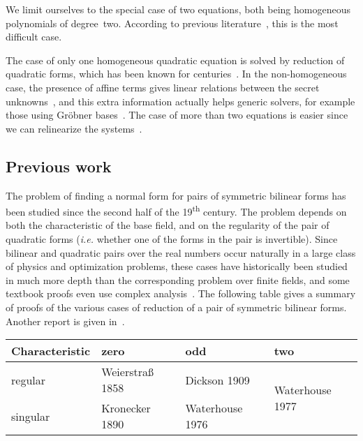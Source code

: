 \documentclass{lms}
\begin{document}
We limit ourselves to the special case of two equations, both
being homogeneous polynomials of degree~two. According to previous
literature~\cite{DBLP:conf/eurocrypt/Perret05,DBLP:conf/eurocrypt/FaugereP06,DBLP:conf/pkc/BouillaguetFFP11,DBLP:conf/eurocrypt/BouillaguetFV13},
this is the most difficult case.

The case of only one homogeneous quadratic equation
is solved by reduction of quadratic forms,
which has been known for centuries~\cite{gauss,lidl1997finite}.
In the non-homogeneous case, the presence of affine terms
gives linear relations between
the secret unknowns~\cite{DBLP:conf/eurocrypt/PatarinGC98},
and this extra information actually helps generic solvers,
for example those using Gröbner bases~\cite{DBLP:conf/eurocrypt/FaugereP06}.
The case of more than two equations is easier since we can relinearize
the systems~\cite{DBLP:conf/pkc/BouillaguetFFP11}.

\subsection*{Previous work}

The problem of finding a normal form for pairs of symmetric bilinear forms
has been studied since the second half of the 19\textsuperscript{th} century.
The problem depends on both the characteristic of the base field,
and on the regularity of the pair of quadratic forms
(\emph{i.e.} whether one of the forms in the pair is invertible).
Since bilinear and quadratic pairs over the real numbers occur naturally
in a large class of physics and optimization problems,
these cases have historically been studied in much more depth
than the corresponding problem over finite fields,
and some textbook proofs even use complex analysis~\cite[XII(56)]{Gantmacher}.
The following table gives a summary of proofs of the various cases
of reduction of a pair of symmetric bilinear forms.
Another report is given in~\cite{olomouc2004fv}.

\setlength\tabcolsep{.5em}\smallbreak
\begin{center}\begin{tabular}{l|lll}
Characteristic & zero & odd & two \\
\toprule
regular & Weierstraß 1858\cite{1858weierstrass}
  & Dickson 1909\cite{ams1909dickson}
  & \multirow{2}{*}{Waterhouse 1977\cite{pacific1977waterhouse}} \\
singular & Kronecker 1890\cite{1890kronecker}
  & Waterhouse 1976\cite{inventiones1976waterhouse} & \\
\bottomrule
\end{tabular}\end{center}\medbreak
\end{document}
